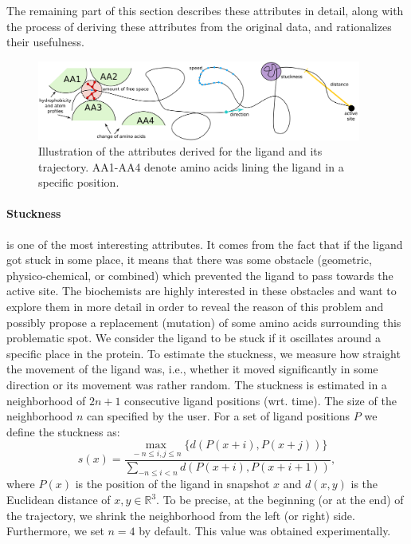 \documentclass[twocolumn]{bmcart}%
\begin{document}
The remaining part of this section describes these attributes in detail, along with the process of deriving these attributes from the original data, and rationalizes their usefulness.
    
\begin{figure}[thb]
	\centering
  \includegraphics[width=0.95\textwidth]{img/attributes.png}
  \caption{\label{fig:attributes} Illustration of the attributes derived for the ligand and its trajectory. AA1-AA4 denote amino acids lining the ligand in a specific position.}
\end{figure}

\paragraph{\textbf{Stuckness}} is one of the most interesting attributes.
It comes from the fact that if the ligand got stuck in some place, it means that there was some obstacle (geometric, physico-chemical, or combined) which prevented the ligand to pass towards the active site.
The biochemists are highly interested in these obstacles and want to explore them in more detail in order to reveal the reason of this problem and possibly propose a replacement (mutation) of some amino acids surrounding this problematic spot.
We consider the ligand to be stuck if it oscillates around a specific place in the protein. %
To estimate the stuckness, we measure how straight the movement of the ligand was, i.e., whether it moved significantly in some direction or its movement was rather random.
The stuckness is estimated in a neighborhood of $2n + 1$ consecutive ligand positions (wrt. time).
The size of the neighborhood $n$ can specified by the user.
For a set of ligand positions $P$ we define the stuckness as:
\begin{equation}
  s(x) = \frac{\max_{\,-n \le i, j \le n} \{ d(P(x + i), P(x + j)) \}}{\sum_{-n \le i < n}{d(P(x + i), P(x + i + 1))}},
  \label{eq:straightness}
\end{equation}
where $P(x)$ is the position of the ligand in snapshot $x$ and $d(x, y)$ is the Euclidean distance of $x, y \in \mathbb{R}^3$.
To be precise, at the beginning (or at the end) of the trajectory, we shrink the neighborhood from the left (or right) side.
Furthermore, we set $n = 4$ by default.
This value was obtained experimentally.
\end{document}
